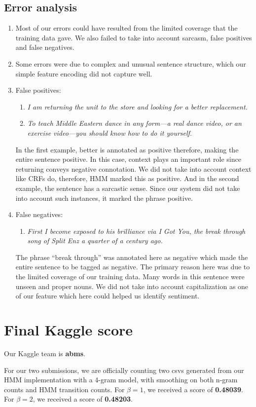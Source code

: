 \documentclass{article}
\begin{document}
\subsection{Error analysis}
\begin{enumerate}
\item Most of our errors could have resulted from the limited coverage that the training data gave. We also failed to take into account sarcasm, false positives and false negatives.
\item Some errors were due to complex and unusual sentence structure, which our simple feature encoding did not capture well.
\item False positives:
  \begin{enumerate}
    \item \textit{I am returning the unit to the store and looking for a \emph{better} replacement.}
    \item \textit{To teach Middle Eastern dance in any form---a real dance video, or an exercise video---you should know how to do it yourself.}
  \end{enumerate}
  In the first example, better is annotated as positive therefore, making the entire sentence positive. In this case, context plays an important role since returning conveys negative connotation. We did not take into account context like CRFs do, therefore, HMM marked this as positive. And in the second example, the sentence has a sarcastic sense. Since our system did not take into account such instances, it marked the phrase positive. 
\item False negatives:
  \begin{enumerate}
  \item \textit{First I become exposed to his brilliance via I Got You, the break through song of Split Enz a quarter of a century ago.}
  \end{enumerate}
  The phrase ``break through'' was annotated here as negative which made the entire sentence to be tagged as negative. The primary reason here was due to the limited coverage of our training data. Many words in this sentence were unseen and proper nouns. We did not take into account capitalization as one of our feature which here could helped us identify sentiment.
\end{enumerate}

\section{Final Kaggle score}
Our Kaggle team is \textbf{abms}.\par
For our two submissions, we are officially counting two csvs generated from our HMM implementation with a 4-gram model, with smoothing on both n-gram counts and HMM transition counts. For $\beta = 1$, we received a score of \textbf{0.48039}. For $\beta = 2$, we received a score of \textbf{0.48203}.\par\medskip
\end{document}
